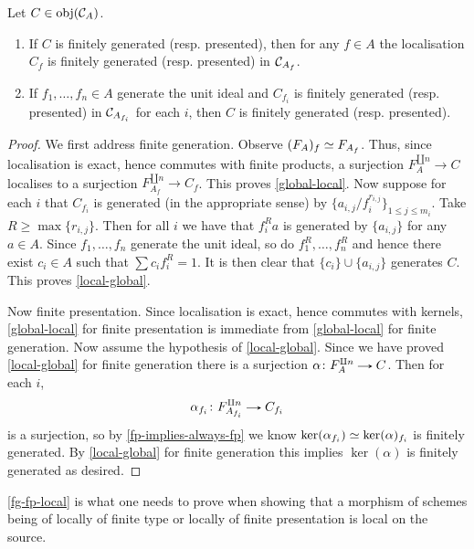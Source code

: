 \begin{proposition}
  \label{fg-fp-local}
  Let $C \in \operatorname{obj}(\mathcal{C}_A)$.
  \begin{enumerate}
  \item \label{global-local} If $C$ is finitely generated
    (resp. presented), then for any $f \in A$ the localisation $C_f$
    is finitely generated (resp. presented) in $\mathcal{C}_{A_f}$.
  \item \label{local-global} If $f_1,\ldots,f_n \in A$ generate the
    unit ideal and $C_{f_i}$ is finitely generated (resp. presented)
    in $\mathcal{C}_{A_{f_i}}$ for each $i$, then $C$ is finitely generated
    (resp. presented).
  \end{enumerate}
\end{proposition}

\begin{proof}
  We first address finite generation. Observe $(F_A)_f \simeq F_{A_f}$.
  Thus, since localisation is exact, hence commutes with finite
  products, a surjection $F_A^{\amalg n} \to C$ localises to a
  surjection $F_{A_f}^{\amalg n} \to C_f$. This proves
  \eqref{global-local}. Now suppose for each $i$ that $C_{f_i}$ is
  generated (in the appropriate sense) by
  $\{a_{i,j}/f_i^{r_{i,j}}\}_{1 \le j \le m_i}$.  Take
  $R \ge \max\{r_{i,j}\}$. Then for all $i$ we have that $f_i^Ra$ is
  generated by $\{a_{i,j}\}$ for any $a \in A$. Since $f_1,\ldots,f_n$
  generate the unit ideal, so do $f_1^R,\ldots,f_n^R$ and hence there
  exist $c_i \in A$ such that $\sum c_if_i^R = 1$. It is then clear
  that $\{c_i\} \cup \{a_{i,j}\}$ generates $C$. This proves
  \eqref{local-global}.

  Now finite presentation. Since localisation is exact, hence commutes
  with kernels, \eqref{global-local} for finite presentation is
  immediate from \eqref{global-local} for finite generation. Now
  assume the hypothesis of \eqref{local-global}. Since we have proved
  \eqref{local-global} for finite generation there is a surjection
  $\alpha \c F_A^{\amalg n} \to C$. Then for each $i$,
  \[
  \alpha_{f_i} \c F_{A_{f_i}}^{\amalg n} \to C_{f_i}
  \]
  is a surjection, so by \eqref{fp-implies-always-fp} we know
  $\ker(\alpha_{f_i}) \simeq \ker(\alpha)_{f_i}$ is finitely
  generated. By \eqref{local-global} for finite generation this
  implies $\ker(\alpha)$ is finitely generated as desired.
\end{proof}

\begin{remark}
  \eqref{fg-fp-local} is what one needs to prove when showing that a
  morphism of schemes being of locally of finite type or locally of
  finite presentation is local on the source.
\end{remark}

